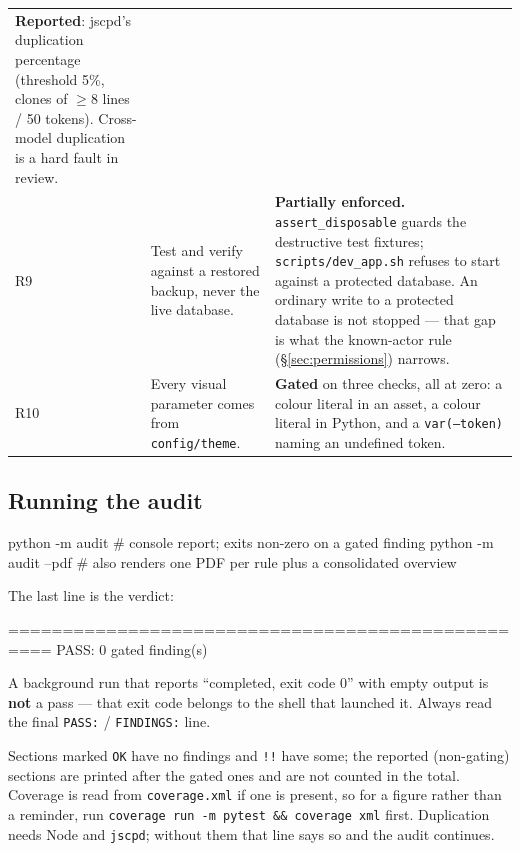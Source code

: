 \documentclass[11pt]{article}
\begin{document}
\begin{longtable}{@{}p{}p{}p{}@{}}
     \textbf{Reported}: jscpd's duplication percentage (threshold 5\%, clones of
     \(\geq\)8 lines / 50 tokens). Cross-model duplication is a hard fault in review. \\
R9 & Test and verify against a restored backup, never the live database. &
     \textbf{Partially enforced.} \texttt{assert\_disposable} guards the destructive test
     fixtures; \texttt{scripts/dev\_app.sh} refuses to start against a protected database.
     An ordinary write to a protected database is not stopped --- that gap is what the
     known-actor rule (\S\ref{sec:permissions}) narrows. \\
R10 & Every visual parameter comes from \texttt{config/theme}. &
     \textbf{Gated} on three checks, all at zero: a colour literal in an asset, a colour
     literal in Python, and a \texttt{var(--token)} naming an undefined token. \\
\bottomrule
\end{longtable}

\subsection{Running the audit}

\begin{code}
python -m audit           # console report; exits non-zero on a gated finding
python -m audit --pdf     # also renders one PDF per rule plus a consolidated overview
\end{code}

The last line is the verdict:

\begin{code}
==================================================
PASS: 0 gated finding(s)
\end{code}

\begin{note}
A background run that reports ``completed, exit code 0'' with empty output is \textbf{not}
a pass --- that exit code belongs to the shell that launched it. Always read the final
\texttt{PASS:} / \texttt{FINDINGS:} line.
\end{note}

Sections marked \texttt{OK} have no findings and \texttt{!!} have some; the reported
(non-gating) sections are printed after the gated ones and are not counted in the total.
Coverage is read from \texttt{coverage.xml} if one is present, so for a figure rather than a
reminder, run \texttt{coverage run -m pytest \&\& coverage xml} first. Duplication needs
Node and \texttt{jscpd}; without them that line says so and the audit continues.
\end{document}
